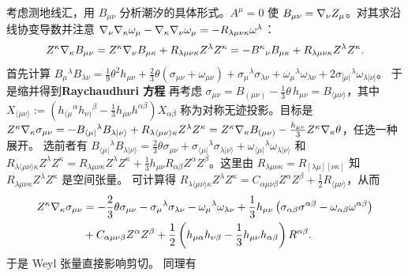 考虑测地线汇，用 $B_{\mu\nu}$ 分析潮汐的具体形式。$A^\mu=0$ 使 $B_{\mu\nu}=\nabla_\nu Z_{\mu}$。对其求沿线协变导数并注意 $\nabla_{\nu}\nabla_{\kappa} \omega_\mu - \nabla_{\kappa}\nabla_{\nu} \omega_\mu = - R_{\lambda\mu\nu\kappa} \omega^\lambda$：
\[Z^\kappa \nabla_\kappa B_{\mu\nu} = Z^\kappa \nabla_\nu B_{\mu\kappa} + R_{\lambda\mu\nu\kappa} Z^\lambda Z^\kappa = - B^\kappa{}_\nu B_{\mu\kappa} + R_{\lambda\mu\nu\kappa} Z^\lambda Z^\kappa.\]
首先计算 $B_\mu{}^{\lambda} B_{\lambda\nu}
=\frac19 \theta^2 h_{\mu\nu}
+\frac23 \theta (\sigma_{\mu\nu}+\omega_{\mu\nu})
+\sigma_\mu{}^{\lambda}\sigma_{\lambda\nu}
+\omega_\mu{}^{\lambda}\omega_{\lambda\nu}
+2\sigma_{[\mu|}{}^{\lambda}\omega_{\lambda|\nu]}$。
于是缩并得到\textbf{Raychaudhuri 方程}
再考虑 $\sigma_{\mu\nu} = B_{(\mu\nu)}-\frac{1}{3}\theta\,h_{\mu\nu} = B_{\langle\mu\nu\rangle}$，其中 $X_{\langle\mu\nu\rangle} :=
\left(
h_{(\mu}{}^{\alpha} h_{\nu)}{}^{\beta}
-\frac{1}{3} h_{\mu\nu} h^{\alpha\beta}
\right) X_{\alpha\beta}$ 称为对称无迹投影。目标是 $Z^\kappa \nabla_\kappa \sigma_{\mu\nu}=-B_{\langle\mu|}{}^{\lambda} B_{\lambda|\nu\rangle}+R_{\lambda\langle\mu\nu\rangle\kappa} Z^\lambda Z^\kappa = Z^\kappa \nabla_\kappa B_{(\mu\nu)}-\frac{h_{\mu\nu}}{3}Z^\kappa \nabla_\kappa\theta$，任选一种展开。
选前者有 $B_{\langle\mu|}{}^{\lambda} B_{\lambda|\nu\rangle} = \frac{2}{3}\theta\sigma_{\mu\nu} + \sigma_{\langle\mu|}{}^{\lambda} \sigma_{\lambda|\nu\rangle} + \omega_{\langle\mu|}{}^{\lambda} \omega_{\lambda|\nu\rangle}$ 和 $R_{\lambda\langle\mu\nu\rangle\kappa} Z^\lambda Z^\kappa = R_{\lambda\mu\nu\kappa} Z^\lambda Z^\kappa + \frac13h_{\mu\nu}R_{\alpha\beta}Z^\alpha Z^\beta$。这里由 $R_{\lambda\mu\nu\kappa}=R_{[\lambda\mu][\nu\kappa]}$ 知 $R_{\lambda\mu\nu\kappa} Z^\lambda Z^\kappa$ 是空间张量。
可计算得 $R_{\lambda\langle\mu\nu\rangle\kappa} Z^\lambda Z^\kappa = C_{\alpha\mu\nu\beta} Z^\alpha Z^\beta + \frac12 R_{\langle \mu\nu \rangle}$，从而
\begin{align}
    Z^\kappa \nabla_\kappa \sigma_{\mu\nu} &= -\frac23 \theta\sigma_{\mu\nu}
  - \sigma_\mu{}^{\lambda}\sigma_{\lambda\nu} - \omega_\mu{}^{\lambda}\omega_{\lambda\nu}
  + \frac13 h_{\mu\nu} \left(\sigma_{\alpha\beta}\sigma^{\alpha\beta}
  - \omega_{\alpha\beta}\omega^{\alpha\beta}\right)\notag \\
  & + C_{\alpha\mu\nu\beta} Z^\alpha Z^\beta + \frac12 \left(
h_{\mu\alpha} h_{\nu\beta}
-\frac{1}{3} h_{\mu\nu} h_{\alpha\beta}
\right)R^{\alpha\beta}.
\end{align}
于是 Weyl 张量直接影响剪切。
同理有

